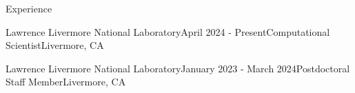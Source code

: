 \documentclass{resume} %
\begin{document}
\begin{rSection}{Experience}

\begin{rSubsection}{Lawrence Livermore National Laboratory}{April 2024 - Present}{Computational Scientist}{Livermore, CA}
\item[]
\vspace{-20pt}
\end{rSubsection}

\begin{rSubsection}{Lawrence Livermore National Laboratory}{January 2023 - March 2024}{Postdoctoral Staff Member}{Livermore, CA}
\item[]
\vspace{-20pt}
\end{rSubsection}


\end{rSection}
\end{document}

